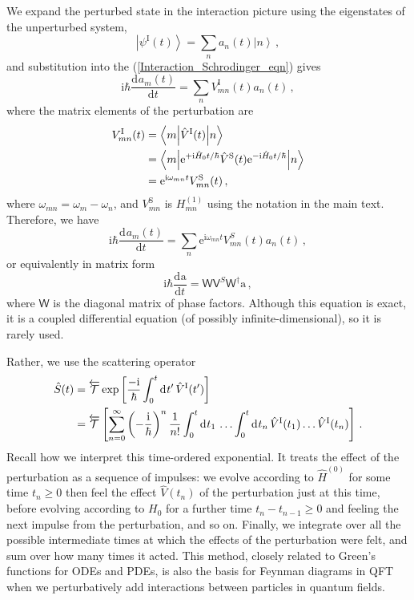 \documentclass{article}
\theoremstyle{plain}\theoremheaderfont{\normalfont\itshape}\theorembodyfont{\rmfamily}\theoremseparator{.}\newtheorem*{rem}{Remark}\newtheorem*{ex}{Example}\newtheorem*{proof}{Proof}\newtheorem*{altp}{Alternative proof}
\theoremstyle{plain}\theoremheaderfont{\normalfont\bfseries}\theorembodyfont{\rmfamily}\theoremseparator{.}\newtheorem{thm}{Theorem}[section]\newtheorem{lem}[thm]{Lemma}\newtheorem{prop}[thm]{Proposition}\newtheorem*{cor}{Corollary}\newtheorem{defn}[thm]{Definition}\newtheorem{clm}[thm]{Claim}\newtheorem{clminproof}{Claim}
\theoremstyle{break}\theoremheaderfont{\normalfont\itshape}\theorembodyfont{\rmfamily}\theoremseparator{.\medskip}\newtheorem*{proofskip}{Proof}\newtheorem*{exs}{Examples}\newtheorem*{rems}{Remarks}
\theoremstyle{break}\theoremheaderfont{\normalfont\bfseries}\theorembodyfont{\rmfamily}\theoremseparator{.\medskip}\newtheorem{lemskip}[thm]{Lemma}\newtheorem{defnskip}[thm]{Definition}\newtheorem{propskip}[thm]{Proposition}\newtheorem{thmskip}[thm]{Theorem}
\numberwithin{equation}{section}
\newcommand{\ii}{\mathrm{i}}
\newcommand{\ee}{\mathrm{e}}
\newcommand{\dd}[2][]{\mathrm{d}^{#1} #2\,}
\newcommand{\dv}[3][]{\frac{\mathrm{d}^{#1} #2}{{\mathrm{d} #3}^{#1}}}
\newcommand{\ket}[1]{\left| #1 \right\rangle}
\newcommand{\mel}[3]{\left\langle #1 \middle| #2 \middle| #3 \right\rangle}
\newcommand{\vb}[1]{\bm{\mathrm{#1}}}
\DeclareMathOperator{\tord}{\overleftarrow{\mathcal{T}}}
\newcommand{\Sch}{^{\mathrm{S}}}
\newcommand{\Int}{^{\mathrm{I}}}
\begin{document}
    We expand the perturbed state in the interaction picture using the eigenstates of the unperturbed system,
    \begin{equation}
        \ket{\psi\Int (t)}=\sum_n a_n(t)\ket{n}\,,
    \end{equation}
    and substitution into the (\ref{Interaction_Schrodinger_eqn}) gives
    \begin{equation}
        \ii\hbar\dv{a_m(t)}{t}=\sum_n V_{mn}\Int(t)a_n(t)\,,
    \end{equation}
    where the matrix elements of the perturbation are
    \begin{align}
        V_{mn}\Int(t)&=\mel{m}{\hat{V}\Int(t)}{n}\notag\\
        &=\mel{m}{\ee^{+\ii\hat{H}_0t/\hbar}\hat{V}\Sch(t)\ee^{-\ii\hat{H}_0t/\hbar}}{n}\notag\\
        &=\ee^{\ii\omega_{mn}t}V_{mn}\Sch(t)\,,
    \end{align}
    where \(\omega_{mn}=\omega_m-\omega_n\), and \(V_{mn}\Sch\) is \(H_{mn}^{(1)}\) using the notation in the main text. Therefore, we have
    \begin{equation}
        \ii\hbar\dv{a_m(t)}{t}=\sum_n \ee^{\ii\omega_{mn}t}V_{mn}^{S}(t)a_n(t)\,,
    \end{equation}
    or equivalently in matrix form
    \begin{equation}
        \ii\hbar\dv{\vb{a}}{t}=\mathsf{W}\mathsf{V}^{S}\mathsf{W}^\dagger\vb{a}\,,
    \end{equation}
    where \(\mathsf{W}\) is the diagonal matrix of phase factors. Although this equation is exact, it is a coupled differential equation (of possibly infinite-dimensional), so it is rarely used.

    Rather, we use the scattering operator
    \begin{align}
        \hat{S}(t)&=\tord\exp\left[\frac{-\ii}{\hbar}\int_{0}^{t}\dd{t'}\hat{V}\Int(t')\right]\notag\\
        &=\tord\left[\sum_{n=0}^{\infty}\left(-\frac{\ii}{\hbar}\right)^n\frac{1}{n!}\int_{0}^{t}\dd{t_1}\dots\int_{0}^{t}\dd{t_n}\hat{V}\Int(t_1)\dots\hat{V}\Int(t_n)\right]\,.
    \end{align}
    Recall how we interpret this time-ordered exponential. It treats the effect of the perturbation as a sequence of impulses: we evolve according to \(\hat{H}^{(0)}\) for some time \(t_n\ge 0\) then feel the effect \(\hat{V}(t_n)\) of the perturbation just at this time, before evolving according to \(H_0\) for a further time \(t_{n}-t_{n-1}\ge 0\) and feeling the next impulse from the perturbation, and so on. Finally, we integrate over all the possible intermediate times at which the effects of the perturbation were felt, and sum over how many times it acted. This method, closely related to Green's functions for ODEs and PDEs, is also the basis for Feynman diagrams in QFT when we perturbatively add interactions between particles in quantum fields.
\end{document}
